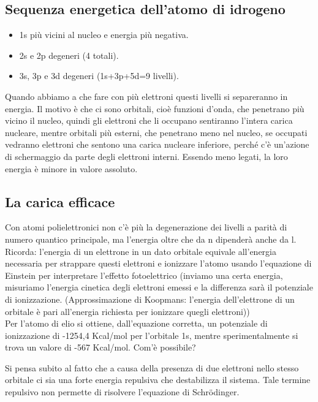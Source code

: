 \subsection{Sequenza energetica dell'atomo di idrogeno}
\begin{itemize}
  \item 1s più vicini al nucleo e energia più negativa.
  \item 2s e 2p degeneri (4 totali).
  \item 3s, 3p e 3d degeneri (1s+3p+5d=9 livelli).
\end{itemize}
Quando abbiamo a che fare con più elettroni questi livelli si separeranno in energia. Il motivo è che ci sono orbitali, cioè funzioni d'onda, che penetrano più vicino il nucleo, quindi gli elettroni che li occupano sentiranno l'intera carica nucleare, mentre orbitali più esterni, che penetrano meno nel nucleo, se occupati vedranno elettroni che sentono una carica nucleare inferiore, perché c'è un'azione di schermaggio da parte degli elettroni interni. Essendo meno legati, la loro energia è minore in valore assoluto.
\subsection{La carica efficace}
Con atomi polielettronici non c'è più la degenerazione dei livelli a parità di numero quantico principale, ma l'energia oltre che da n dipenderà anche da l.\\

Ricorda: l'energia di un elettrone in un dato orbitale  equivale all'energia necessaria per strappare questi elettroni e ionizzare l'atomo usando l'equazione di Einstein per interpretare l'effetto fotoelettrico (inviamo una certa energia, misuriamo l'energia cinetica degli elettroni emessi e la differenza sarà il potenziale di ionizzazione. (Approssimazione di Koopmans: l'energia dell'elettrone di un orbitale è pari all'energia richiesta per ionizzare quegli elettroni))\\

Per l'atomo di elio si ottiene, dall'equazione corretta, un potenziale di ionizzazione di -1254,4 Kcal/mol per l'orbitale 1s, mentre sperimentalmente si trova un valore di -567 Kcal/mol. Com'è possibile?

Si pensa subito al fatto che a causa della presenza di due elettroni nello stesso orbitale ci sia una forte energia repulsiva che destabilizza il sistema. Tale termine repulsivo non permette di risolvere l'equazione di Schrödinger.

